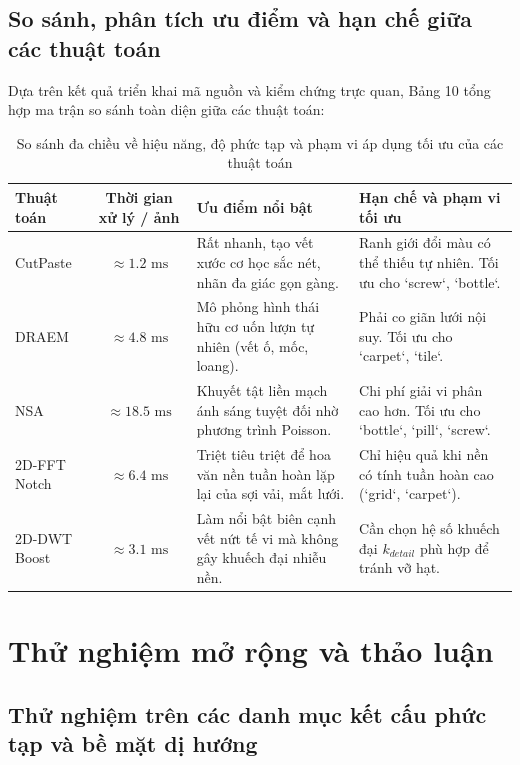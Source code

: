 \subsection{So sánh, phân tích ưu điểm và hạn chế giữa các thuật toán}

Dựa trên kết quả triển khai mã nguồn và kiểm chứng trực quan, Bảng 10 tổng hợp ma trận so sánh toàn diện giữa các thuật toán:

\begin{table}[h]
\centering
\caption{So sánh đa chiều về hiệu năng, độ phức tạp và phạm vi áp dụng tối ưu của các thuật toán}
\label{tab:algorithm_tradeoffs}
\begin{tabularx}{\textwidth}{p{2.8cm} c p{4.2cm} X}
\toprule
\textbf{Thuật toán} & \textbf{Thời gian xử lý / ảnh} & \textbf{Ưu điểm nổi bật} & \textbf{Hạn chế và phạm vi tối ưu} \\
\midrule
CutPaste & $\approx 1.2\text{ ms}$ & Rất nhanh, tạo vết xước cơ học sắc nét, nhãn đa giác gọn gàng. & Ranh giới đổi màu có thể thiếu tự nhiên. Tối ưu cho `screw`, `bottle`. \\
\addlinespace
DRAEM & $\approx 4.8\text{ ms}$ & Mô phỏng hình thái hữu cơ uốn lượn tự nhiên (vết ố, mốc, loang). & Phải co giãn lưới nội suy. Tối ưu cho `carpet`, `tile`. \\
\addlinespace
NSA & $\approx 18.5\text{ ms}$ & Khuyết tật liền mạch ánh sáng tuyệt đối nhờ phương trình Poisson. & Chi phí giải vi phân cao hơn. Tối ưu cho `bottle`, `pill`, `screw`. \\
\addlinespace
2D-FFT Notch & $\approx 6.4\text{ ms}$ & Triệt tiêu triệt để hoa văn nền tuần hoàn lặp lại của sợi vải, mắt lưới. & Chỉ hiệu quả khi nền có tính tuần hoàn cao (`grid`, `carpet`). \\
\addlinespace
2D-DWT Boost & $\approx 3.1\text{ ms}$ & Làm nổi bật biên cạnh vết nứt tế vi mà không gây khuếch đại nhiễu nền. & Cần chọn hệ số khuếch đại $k_{detail}$ phù hợp để tránh vỡ hạt. \\
\bottomrule
\end{tabularx}
\end{table}

\section{Thử nghiệm mở rộng và thảo luận}

\subsection{Thử nghiệm trên các danh mục kết cấu phức tạp và bề mặt dị hướng}

